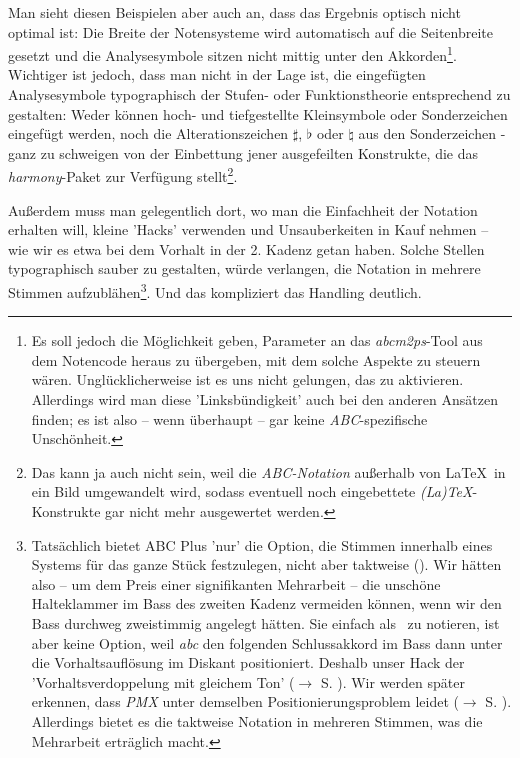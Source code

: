 Man sieht diesen Beispielen aber auch an, dass das Ergebnis optisch nicht
optimal ist: Die Breite der Notensysteme wird automatisch auf die Seitenbreite
gesetzt und die Analysesymbole sitzen nicht mittig unter den
Akkorden\footnote{Es soll jedoch die Möglichkeit geben, Parameter an das
\textit{abcm2ps}-Tool aus dem Notencode heraus zu übergeben, mit dem solche
Aspekte zu steuern wären. Unglücklicherweise ist es uns nicht gelungen, das zu
aktivieren. Allerdings wird man diese 'Linksbündigkeit' auch bei den anderen
Ansätzen finden; es ist also -- wenn überhaupt -- gar keine
\textit{ABC}-spezifische Unschönheit.}. \label{AppraisalABC}Wichtiger ist jedoch,
dass man nicht in der Lage ist, die eingefügten Analysesymbole typographisch der
Stufen- oder Funktionstheorie entsprechend zu gestalten: Weder können hoch- und
tiefgestellte Kleinsymbole oder Sonderzeichen eingefügt werden, noch die
Alterationszeichen $\sharp$, $\flat$ oder $\natural$ aus den Sonderzeichen -
ganz zu schweigen von der Einbettung jener ausgefeilten Konstrukte, die das
\textit{harmony}-Paket zur Verfügung stellt\footnote{Das kann ja auch nicht sein,
weil die \textit{ABC-Notation} außerhalb von \LaTeX\ in ein Bild umgewandelt wird,
sodass eventuell noch eingebettete \textit{(La)\TeX}-Konstrukte gar nicht mehr
ausgewertet werden.}.

Außerdem muss man gelegentlich dort, wo man die Einfachheit der Notation
erhalten will, kleine 'Hacks' verwenden und Unsauberkeiten in Kauf nehmen -- wie
wir es etwa bei dem Vorhalt in der 2. Kadenz getan haben. Solche Stellen
typographisch sauber zu gestalten, würde verlangen, die Notation in mehrere
Stimmen aufzublähen\footnote{Tatsächlich bietet ABC Plus 'nur' die Option, die
Stimmen innerhalb eines Systems für das ganze Stück festzulegen, nicht aber
taktweise (\cite[vgl.][49f]{Gonzato2018b}). Wir hätten also -- um dem Preis einer
signifikanten Mehrarbeit -- die unschöne Halteklammer im Bass des zweiten Kadenz
vermeiden können, wenn wir den Bass durchweg zweistimmig angelegt hätten. Sie
einfach als \Halb\ zu notieren, ist aber keine Option, weil \textit{abc} den
folgenden Schlussakkord im Bass dann unter die Vorhaltsauflösung im Diskant
positioniert. Deshalb unser Hack der 'Vorhaltsverdoppelung mit gleichem Ton'
($\rightarrow$ S. ). Wir werden später erkennen, dass
\textit{PMX} unter demselben Positionierungsproblem leidet ($\rightarrow$ S.
). Allerdings bietet es die taktweise Notation in
mehreren Stimmen, was die Mehrarbeit erträglich macht.
}. Und das kompliziert das Handling deutlich.

